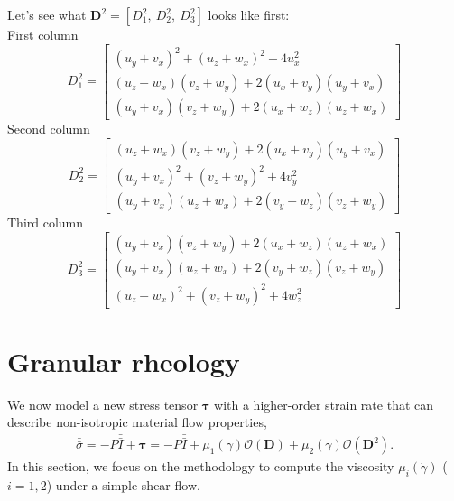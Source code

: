 Let's see what $\bm{D}^2 = \left[D^2_1, \ D^2_2, \ D^2_3 \right]$ looks like first: 
\\
First column 
\[
D^2_1 = 
\begin{bmatrix}
 \left(u_y+v_x\right)^2+\left(u_z+w_x\right)^2+4 u_x^2 
 \\
  \left(u_z+w_x\right) \left(v_z+w_y\right)+2 \left(u_x+v_y\right) \left(u_y+v_x\right)
  \\
  \left(u_y+v_x\right) \left(v_z+w_y\right)+2 \left(u_x+w_z\right) \left(u_z+w_x\right)
\end{bmatrix}
\]
Second column
\[
D^2_2 = 
\begin{bmatrix}
 \left(u_z+w_x\right) \left(v_z+w_y\right)+2 \left(u_x+v_y\right) \left(u_y+v_x\right)
 \\
 \left(u_y+v_x\right)^2+\left(v_z+w_y\right)^2+4 v_y^2
 \\
 \left(u_y+v_x\right) \left(u_z+w_x\right)+2 \left(v_y+w_z\right) \left(v_z+w_y\right)
\end{bmatrix}
\]
Third column
\[
D^2_3=
\begin{bmatrix}
 \left(u_y+v_x\right) \left(v_z+w_y\right)+2 \left(u_x+w_z\right) \left(u_z+w_x\right)
 \\
 \left(u_y+v_x\right) \left(u_z+w_x\right)+2 \left(v_y+w_z\right) \left(v_z+w_y\right)
 \\
 \left(u_z+w_x\right)^2+\left(v_z+w_y\right)^2+4 w_z^2
\end{bmatrix}
\]
\section{Granular rheology}
We now model a new stress tensor $\bm \tau$ with a higher-order strain rate that can describe non-isotropic material flow properties,
\begin{align}
  \bar{\bar{\sigma}}
    = -P \bar{\bar{I}}  + \bm{\tau}
    =  -P \bar{\bar{I}}  
    + \mu_1(\dot{\gamma}) \mathcal{O}({\bm D})
    + \mu_2(\dot{\gamma}) \mathcal{O}({\bm D^2}).
  \end{align}
In this section, we focus on the methodology to compute the viscosity $\mu_i ({\dot{\gamma}})$ ($i = 1,2$) under a simple shear flow. 

